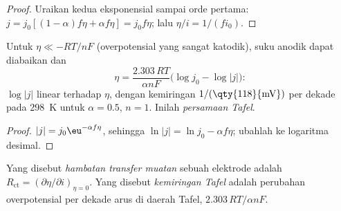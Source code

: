 \begin{proof}
Uraikan kedua eksponensial sampai orde pertama:
$j = j_0[(1 - \alpha)f\eta + \alpha f\eta] = j_0f\eta$; lalu $\eta/i = 1/(fi_0)$.
\end{proof}

\begin{corollary}\label{cor:b3:electrode-kinetics:tafel}
Untuk $\eta \ll -RT/nF$ (overpotensial yang sangat katodik), suku anodik dapat
diabaikan dan
\[
  \eta = \frac{2.303\,RT}{\alpha nF}\bigl(\log j_0 - \log|j|\bigr):
\]
$\log|j|$ linear terhadap $\eta$, dengan kemiringan $1/(\text{\qty{118}{mV}})$ per dekade
pada \qty{298}{K} untuk $\alpha = 0.5$, $n =
1$. Inilah \emph{persamaan Tafel}.
\end{corollary}

\begin{proof}
$|j| = j_0\eu^{-\alpha f\eta}$, sehingga $\ln|j| = \ln j_0 - \alpha f\eta$; ubahlah ke logaritma desimal.
\end{proof}

\begin{definition}\label{def:b3:electrode-kinetics:charge-transfer}
Yang disebut \emph{hambatan transfer muatan}
sebuah elektrode adalah $R_{\mathrm{ct}} = (\partial\eta/\partial i)_{\eta = 0}$. Yang
disebut \emph{kemiringan Tafel} adalah perubahan
overpotensial per dekade arus di daerah Tafel, $2.303\,RT/\alpha nF$.
\end{definition}

